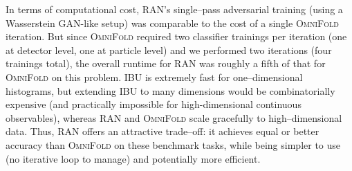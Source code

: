             In terms of computational cost, RAN’s single--pass adversarial training (using a Wasserstein GAN-like setup) was comparable to the cost of a single \textsc{OmniFold} iteration.
            But since \textsc{OmniFold} required two classifier trainings per iteration (one at detector level, one at particle level) and we performed two iterations (four trainings total), the overall runtime for RAN was roughly a fifth of that for \textsc{OmniFold} on this problem.
            IBU is extremely fast for one--dimensional histograms, but extending IBU to many dimensions would be combinatorially expensive (and practically impossible for high-dimensional continuous observables), whereas RAN and \textsc{OmniFold} scale gracefully to high--dimensional data.
            Thus, RAN offers an attractive trade--off: it achieves equal or better accuracy than \textsc{OmniFold} on these benchmark tasks, while being simpler to use (no iterative loop to manage) and potentially more efficient.

